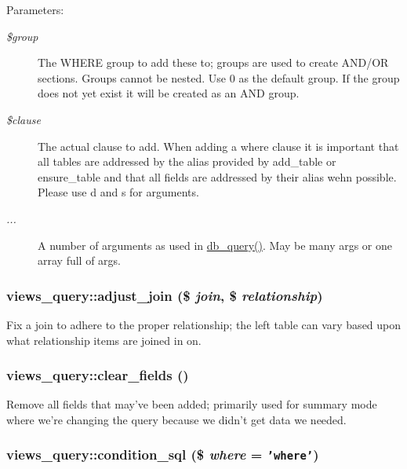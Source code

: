 \begin{Desc}
\item[Parameters:]
\begin{description}
\item[{\em \$group}]The WHERE group to add these to; groups are used to create AND/OR sections. Groups cannot be nested. Use 0 as the default group. If the group does not yet exist it will be created as an AND group. \item[{\em \$clause}]The actual clause to add. When adding a where clause it is important that all tables are addressed by the alias provided by add\_\-table or ensure\_\-table and that all fields are addressed by their alias wehn possible. Please use d and s for arguments. \item[{\em ...}]A number of arguments as used in \hyperlink{database_8mysql-common_8inc_9e096321b86945d128746ac7bedce8f3}{db\_\-query()}. May be many args or one array full of args. \end{description}
\end{Desc}
\hypertarget{classviews__query_9eb7d6626aa24ae83d922cc59682318c}{
\subsubsection[{adjust\_\-join}]{\setlength{\rightskip}{0pt plus 5cm}views\_\-query::adjust\_\-join (\$ {\em join}, \/  \$ {\em relationship})}}
\label{classviews__query_9eb7d6626aa24ae83d922cc59682318c}


Fix a join to adhere to the proper relationship; the left table can vary based upon what relationship items are joined in on. \hypertarget{classviews__query_f36b1f088b20f1d98d23dbf49ee68e97}{
\subsubsection[{clear\_\-fields}]{\setlength{\rightskip}{0pt plus 5cm}views\_\-query::clear\_\-fields ()}}
\label{classviews__query_f36b1f088b20f1d98d23dbf49ee68e97}


Remove all fields that may've been added; primarily used for summary mode where we're changing the query because we didn't get data we needed. \hypertarget{classviews__query_2048d9a8aefd815a30833b26f6070fb2}{
\subsubsection[{condition\_\-sql}]{\setlength{\rightskip}{0pt plus 5cm}views\_\-query::condition\_\-sql (\$ {\em where} = {\tt 'where'})}}
\label{classviews__query_2048d9a8aefd815a30833b26f6070fb2}


